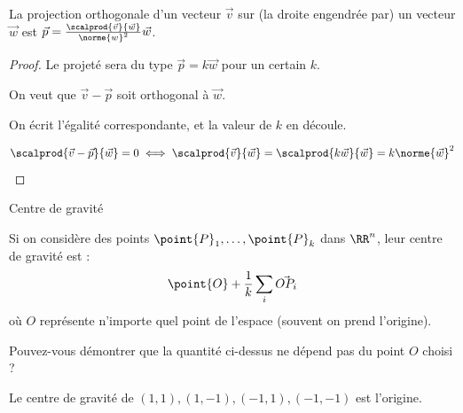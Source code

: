 \begin{frame}%
  \begin{corollary}La projection orthogonale d'un vecteur \(\vec{v}\) sur (la droite engendrée par) un vecteur \(\vec{w}\) est
    \(\vec p = \frac{\scalprod{\vec{v}}{\vec{w}}}{\norme{w}^{2}} \vec{w}\).
  \end{corollary}\pause
  \begin{proof}
    Le projeté sera du type \(\vec{p} = k \vec{w}\) pour un certain \(k\).\pause
    
    On veut que \(\vec{v} - \vec{p}\) soit orthogonal à \(\vec{w}\).\pause

    On écrit l'égalité correspondante, et la valeur de \(k\) en découle.

    \begin{equation*}
      \scalprod{\vec{v}-\vec{p}}{\vec{w}} = 0 \iff \scalprod{\vec{v}}{\vec{w}} = \scalprod{k\vec{w}}{\vec{w}} = k \norme{\vec{w}}^{2}
    \end{equation*}
  \end{proof}
\end{frame}

\begin{frame}{Centre de gravité}%
  \begin{definition}
    Si on considère des points \(\point{P}_{1}, \ldots, \point{P}_{k}\) dans \(\RR^n\), leur centre de gravité est :
    \begin{equation*}
      \point{O} + \frac{1}{k}\sum_i \vec{OP_{i}}
    \end{equation*}
    où \(O\) représente n'importe quel point de l'espace (souvent on prend l'origine).
  \end{definition}\pause
  \begin{remark*}
    Pouvez-vous démontrer que la quantité ci-dessus ne dépend pas du point \(O\) choisi ?
  \end{remark*}\pause
  \begin{example}
    Le centre de gravité de \((1,1), (1,-1),(-1,1), (-1,-1)\) est l'origine.
  \end{example}
\end{frame}
